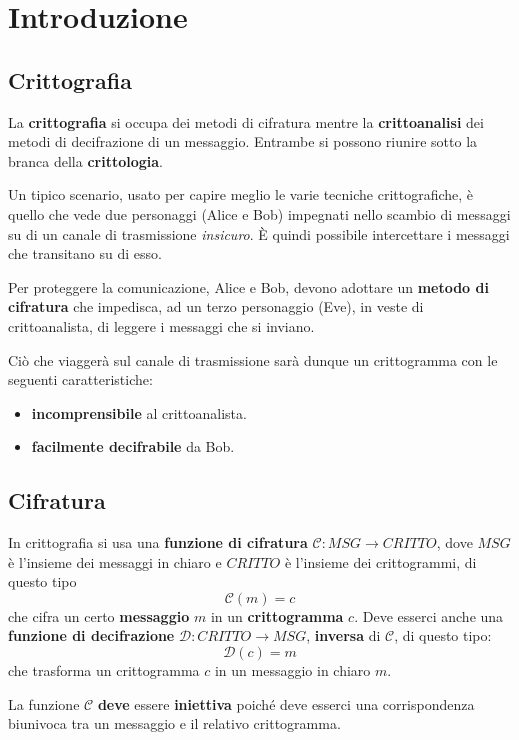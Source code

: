 \chapter{Introduzione}\label{intro}
\section{Crittografia}\label{crittografia}
La \textbf{crittografia} si occupa dei metodi di cifratura mentre la \textbf{crittoanalisi} dei metodi di decifrazione
di un messaggio. Entrambe si possono riunire sotto la branca della \textbf{crittologia}.

Un tipico scenario, usato per capire meglio le varie tecniche crittografiche, \`e quello che vede due personaggi (Alice
e Bob) impegnati nello scambio di messaggi su di un canale di trasmissione \emph{insicuro}. \`E quindi possibile
intercettare i messaggi che transitano su di esso.

Per proteggere la comunicazione, Alice e Bob, devono adottare un \textbf{metodo di cifratura} che impedisca, ad un terzo
personaggio (Eve), in veste di crittoanalista, di leggere i messaggi che si inviano.

Ci\`o che viagger\`a sul canale di trasmissione sar\`a dunque un crittogramma con le seguenti caratteristiche:
\begin{itemize}
	\item \textbf{incomprensibile} al crittoanalista.
	\item \textbf{facilmente decifrabile} da Bob.
\end{itemize}

\section{Cifratura}\label{cifratura}
In crittografia si usa una \textbf{funzione di cifratura} $\mathcal{C} : MSG \rightarrow CRITTO$, dove $MSG$ \`e l'insieme
dei messaggi in chiaro e $CRITTO$ \`e l'insieme dei crittogrammi, di questo tipo
\[ \mathcal{C}(m) = c \]
che cifra un certo \textbf{messaggio} $m$ in un \textbf{crittogramma} $c$. Deve esserci anche una
\textbf{funzione di decifrazione} $\mathcal{D} : CRITTO \rightarrow MSG$, \textbf{inversa} di $\mathcal{C}$, di questo
tipo:
\[ \mathcal{D}(c) = m \]
che trasforma un crittogramma $c$ in un messaggio in chiaro $m$.

La funzione $\mathcal{C}$ \textbf{deve} essere \textbf{iniettiva} poich\'e deve esserci una corrispondenza biunivoca
tra un messaggio e il relativo crittogramma.

